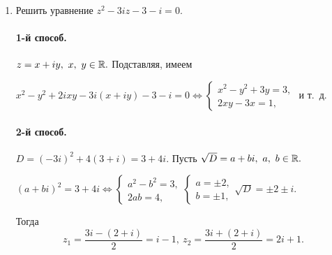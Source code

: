 \documentclass[../../main.tex]{subfiles}
\begin{document}
\begin{examples}
\begin{enumerate}
		\item Решить уравнение $z^2 - 3iz - 3- i = 0.$
		
		\paragraph{1-й способ.} $z = x+iy,\ x,\ y\in\mathbb{R}.$ Подставляя, имеем
		
		$x^2 - y^2 +2ixy - 3i(x+iy) - 3- i =0 \iff
		\begin{cases} 
		x^2 - y^2 + 3y  = 3,\\
		2xy - 3x  =1,
		\end{cases}$ и т.~д.
		
		\paragraph{2-й способ.}
		$D = (-3i)^2 + 4(3+i) =3+4i.$ Пусть $\sqrt{D} = a + bi,\ a,\ b \in \mathbb{R}.$
		
		$(a+bi)^2 = 3+4i \iff 
		\begin{cases} 
		a^2 - b^2 = 3,\\
		2ab  = 4,
		\end{cases}
		\begin{cases} 
		a = \pm 2,\\
		b  = \pm 1,
		\end{cases}
		\sqrt{D} = \pm2\pm i.
		$
		
		Тогда \[z_1 = \frac{3i - (2+i)}{2} = i-1,\ z_2 = \frac{3i + (2+i)}{2} 
		=2i+1.\]
		\end{enumerate}
		\end{examples}
\end{document}
